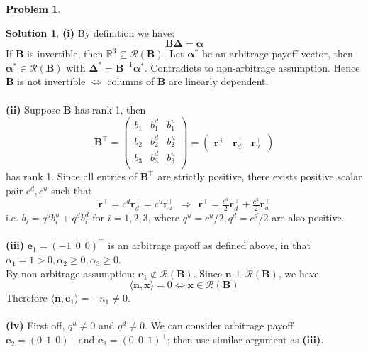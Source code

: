 \documentclass[a4paper, 10pt]{article}
\theoremstyle{definition}
\newtheorem{problem}{Problem}
\theoremstyle{hSol}
\newtheorem*{solution}{Solution}
\begin{document}
\begin{problem} 
\end{problem}
\begin{solution} \textbf{(i)} By definition we have:
\begin{equation}
  \bm{B \Delta} = \bm{\alpha}
\end{equation}
If $\bm{B}$ is invertible, then $\mathbb{R}^3 \subseteq \mathcal{R}(\bm{B})$. Let $\bm{\alpha}^*$ be an arbitrage payoff vector, then $\bm{\alpha}^* \in \mathcal{R}(\bm{B})$ with $\bm{\Delta}^* = \bm{B}^{-1}\bm{\alpha}^*$. Contradicts to non-arbitrage assumption. Hence $\bm{B}$ is not invertible $\iff$ columns of $\bm{B}$ are linearly dependent. \\
~\\
\textbf{(ii)} Suppose $\bm{B}$ has rank 1, then 
$$
\bm{B}^{\top} = \begin{pmatrix}
  b_1 & b_1^d & b_1^u \\
  b_2 & b_2^d & b_2^u \\
  b_3 & b_3^d & b_3^u \\
\end{pmatrix} = \begin{pmatrix}
  \bm{r}^{\top} & \bm{r}_d^{\top} & \bm{r}_u^{\top}
\end{pmatrix}
$$
has rank 1. Since all entries of $\bm{B}^{\top}$ are strictly positive, there exists positive scalar pair $c^d, c^u$ such that
$$
\bm{r}^{\top} = c^d\bm{r}_d^{\top} = c^u\bm{r}_u^{\top}~~\Rightarrow~~\bm{r}^{\top} = \tfrac{c^d}{2}\bm{r}_d^{\top} + \tfrac{c^u}{2}\bm{r}_u^{\top}
$$
i.e. $b_i = q^u b_i^u + q^d b_i^d$ for $i=1,2,3$, where $q^u = c^u/2, q^d = c^d/2$ are also positive.\\
~\\
\textbf{(iii)} $\bm{e}_1 = (-1~~0~~0)^{\top}$ is an arbitrage payoff as defined above, in that $\alpha_1=1>0, \alpha_2\geq 0, \alpha_3 \geq 0$. \\
By non-arbitrage assumption: $\bm{e}_1 \notin \mathcal{R}(\bm{B})$. Since $\bm{n} \perp \mathcal{R}(\bm{B})$, we have
\begin{equation}
  \langle \bm{n}, \bm{x} \rangle =  0 \iff \bm{x} \in \mathcal{R}(\bm{B})
\end{equation}
Therefore $\langle \bm{n}, \bm{e}_1 \rangle = -n_1 \ne 0$.\\
~\\
\textbf{(iv)} First off, $q^u \ne 0$ and $q^d \ne 0$. We can consider arbitrage payoff $\bm{e}_2 = (0~~1~~0)^{\top}$ and $\bm{e}_2 = (0~~0~~1)^{\top}$; then use similar argument as \textbf{(iii)}. \\

\end{solution}
\end{document}
